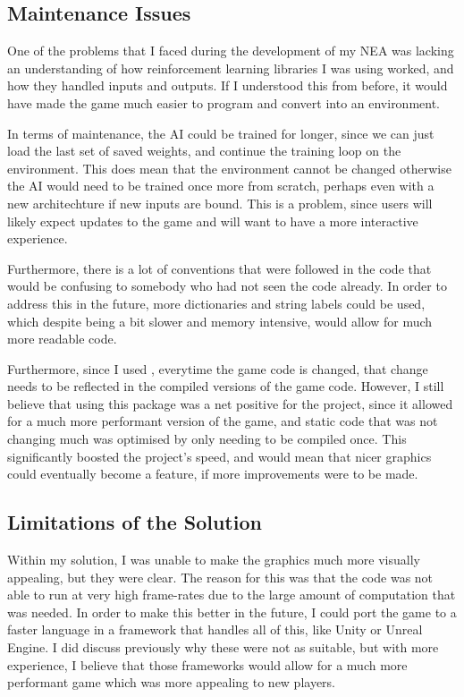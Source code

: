 \subsection{Maintenance Issues}

One of the problems that I faced during the development of my NEA was lacking an understanding of how reinforcement learning libraries I was using worked, and how they handled inputs and outputs. If I understood this from before, it would have made the game much easier to program and convert into an environment.

\vs
In terms of maintenance, the AI could be trained for longer, since we can just load the last set of saved weights, and continue the training loop on the environment. This does mean that the environment cannot be changed otherwise the AI would need to be trained once more from scratch, perhaps even with a new architechture if new inputs are bound. This is a problem, since users will likely expect updates to the game and will want to have a more interactive experience.

\vs
Furthermore, there is a lot of conventions that were followed in the code that would be confusing to somebody who had not seen the code already. In order to address this in the future, more dictionaries and string labels could be used, which despite being a bit slower and memory intensive, would allow for much more readable code.

\vs
Furthermore, since I used , everytime the game code is changed, that change needs to be reflected in the compiled versions of the game code. However, I still believe that using this package was a net positive for the project, since it allowed for a much more performant version of the game, and static code that was not changing much was optimised by only needing to be compiled once. This significantly boosted the project's speed, and would mean that nicer graphics could eventually become a feature, if more improvements were to be made.


\subsection{Limitations of the Solution}

Within my solution, I was unable to make the graphics much more visually appealing, but they were clear. The reason for this was that the code was not able to run at very high frame-rates due to the large amount of computation that was needed. In order to make this better in the future, I could port the game to a faster language in a framework that handles all of this, like Unity or Unreal Engine. I did discuss previously why these were not as suitable, but with more experience, I believe that those frameworks would allow for a much more performant game which was more appealing to new players.

